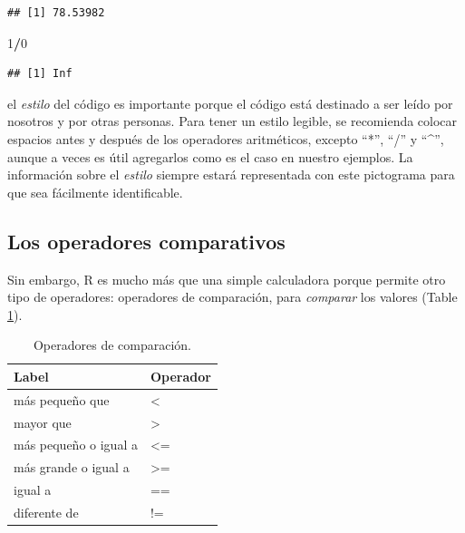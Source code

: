 \documentclass[]{book}
\makeatletter
\newenvironment{Shaded}{\begin{snugshade}}{\end{snugshade}}
\newcommand{\DecValTok}[1]{\textcolor[rgb]{0.00,0.00,0.81}{#1}}
\newcommand{\OperatorTok}[1]{\textcolor[rgb]{0.81,0.36,0.00}{\textbf{#1}}}
\newenvironment{kframe}{%
\medskip{}
\setlength{\fboxsep}{.8em}
 \def\at@end@of@kframe{}%
 \ifinner\ifhmode%
  \def\at@end@of@kframe{\end{minipage}}%
  \begin{minipage}{\columnwidth}%
 \fi\fi%
 \def\FrameCommand##1{\hskip\@totalleftmargin \hskip-\fboxsep
 \colorbox{shadecolor}{##1}\hskip-\fboxsep
     \hskip-\linewidth \hskip-\@totalleftmargin \hskip\columnwidth}%
 \MakeFramed {\advance\hsize-\width
   \@totalleftmargin\z@ \linewidth\hsize
   \@setminipage}}%
 {\par\unskip\endMakeFramed%
 \at@end@of@kframe}
\newenvironment{rmdblock}[1]
  {
  \begin{itemize}
  \renewcommand{\labelitemi}{
    \raisebox{-.7\height}[0pt][0pt]{
      {\setkeys{Gin}{width=3em,keepaspectratio}\texttt{[image: myIcons/\#1]}} %
    }
  }
  \setlength{\fboxsep}{1em}
  \begin{kframe}
  \item
  }
  {
  \end{kframe}
  \end{itemize}
  }
\newenvironment{rmdstyle}     %
  {\begin{rmdblock}{style}}   %
  {\end{rmdblock}}            %
\makeatother
\begin{document}
\begin{verbatim}
## [1] 78.53982
\end{verbatim}

\begin{Shaded}
\begin{Highlighting}[]
\DecValTok{1}\OperatorTok{/}\DecValTok{0}
\end{Highlighting}
\end{Shaded}

\begin{verbatim}
## [1] Inf
\end{verbatim}

\begin{rmdstyle}
el \emph{estilo} del código es importante porque el código está
destinado a ser leído por nosotros y por otras personas. Para tener un
estilo legible, se recomienda colocar espacios antes y después de los
operadores aritméticos, excepto ``*'', ``/'' y ``\^{}'', aunque a veces
es útil agregarlos como es el caso en nuestro ejemplos. La información
sobre el \emph{estilo} siempre estará representada con este pictograma
para que sea fácilmente identificable.
\end{rmdstyle}

\subsection{Los operadores
comparativos}\label{los-operadores-comparativos}

Sin embargo, R es mucho más que una simple calculadora porque permite
otro tipo de operadores: operadores de comparación, para \emph{comparar}
los valores (Table \ref{tab:tabOpCom}).

\begin{table}

\caption{\label{tab:tabOpCom}Operadores de comparación.\label{tab:tabOpCom}}
\centering
\begin{tabular}[t]{l|l}
\hline
Label & Operador\\
\hline
más pequeño que & <\\
\hline
mayor que & >\\
\hline
más pequeño o igual a & <=\\
\hline
más grande o igual a & >=\\
\hline
igual a & ==\\
\hline
diferente de & !=\\
\hline
\end{tabular}
\end{table}
\end{document}
